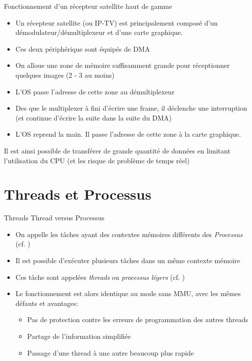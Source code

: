 \begin{frame}[fragile=singleslide]{Fonctionnement    d'un    récepteur
    satellite haut de gamme}
  \begin{itemize}
  \item Un  récepteur satellite (ou IP-TV)  est principalement composé
    d'un démodulateur/démultiplexeur et d'une carte graphique.
  \item Ces deux périphérique sont équipés de DMA
  \item  On  alloue  une  zone  de mémoire  suffisamment  grande  pour
    réceptionner quelques images (2 - 3 au moins)
  \item L'OS passe l'adresse de cette zone au démultiplexeur
  \item Des que le multiplexer à fini d'écrire une frame, il déclenche
    une interruption (et  continue d'écrire la suite dans  la suite du
    DMA)
  \item L'OS  reprend la main. Il  passe l'adresse de cette  zone à la
    carte graphique.
  \end{itemize}
  Il est ainsi possible de transférer de grande quantité de données en
  limitant l'utilisation  du CPU (et  les risque de problème  de temps
  réel)
\end{frame}

\section{Threads et Processus}

\begin{frame}{Threads}
  Thread versus Processus
  \begin{itemize}
  \item On appelle les  tâches ayant des contextes mémoires différents
    des \emph{Processus} (cf. )
  \item  Il est  possible  d'exécuter plusieurs  tâches  dans un  même
    contexte mémoire
  \item  Ces  tâche sont  appelées  \emph{threads} ou  \emph{processus
      légers} (cf. )
  \item Le fonctionnement  est alors identique au mode  sans MMU, avec
    les mêmes défauts et avantages:
    \begin{itemize}
    \item Pas  de protection contre  les erreurs de  programmation des
      autres threads
    \item Partage de l'information simplifiée
    \item Passage d'une thread à une autre beaucoup plus rapide
    \end{itemize}
  \end{itemize}
\end{frame}

